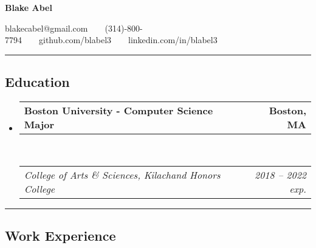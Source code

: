 \documentclass[11pt,letterpaper]{article}
\makeatletter
\newcommand{\headerrow}[2]
{\begin{tabular*}{\linewidth}{l@{\extracolsep{\fill}}r}
	#1 &
	#2 \\
\end{tabular*}}
\makeatother
\begin{document}
\begin{center}
{\LARGE \textbf{Blake Abel}}

blakecabel@gmail.com\ \ \textbullet \ \ (314)-800-7794\ \ \textbullet \ \ github.com/blabel3\ \ \textbullet \ \ linkedin.com/in/blabel3

\end{center}

\hrule
\vspace{-0.4em}
\subsection*{Education}

\begin{itemize}
	\parskip=0.1em

	\item 
	\headerrow
		{\textbf{Boston University - Computer Science Major}}
		{\textbf{Boston, MA}}
	\\
	\headerrow
		{\emph{College of Arts \& Sciences, Kilachand Honors College}}
		{\emph{2018 -- 2022 exp.}}
	

\end{itemize}

\hrule
\vspace{-0.4em}
\subsection*{Work Experience}
\end{document}
